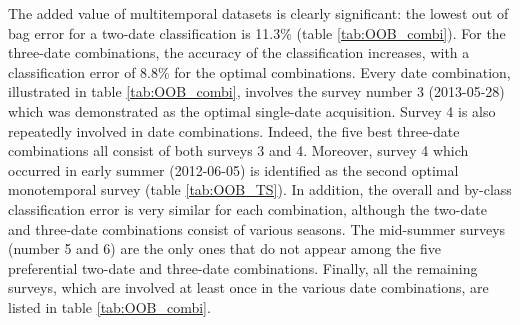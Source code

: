 \documentclass[remotesensing,article,submit,moreauthors,pdftex,12pt,a4paper]{mdpi} %
\begin{document}
The added value of multitemporal datasets is clearly significant: the lowest out of bag error for a two-date classification is 11.3\% (table \ref{tab:OOB_combi}). For the three-date combinations, the accuracy of the classification increases, with a classification error of 8.8\% for the optimal combinations.
Every date combination, illustrated in table \ref{tab:OOB_combi}, involves the survey number 3 (2013-05-28) which was demonstrated as the optimal single-date acquisition.  
Survey 4 is also repeatedly involved in date combinations. 
Indeed, the five best three-date combinations all consist of both surveys 3 and 4. 
Moreover, survey 4 which occurred in early summer (2012-06-05) is identified as the second optimal monotemporal survey (table \ref{tab:OOB_TS}). 
In addition, the overall and by-class classification error is very similar for each combination, although the two-date and three-date combinations consist of various seasons. 
The mid-summer surveys (number 5 and 6) are the only ones that do not appear among the five preferential two-date and three-date combinations. 
Finally, all the remaining surveys, which are involved at least once in the various date combinations, are listed in table \ref{tab:OOB_combi}.
\end{document}
